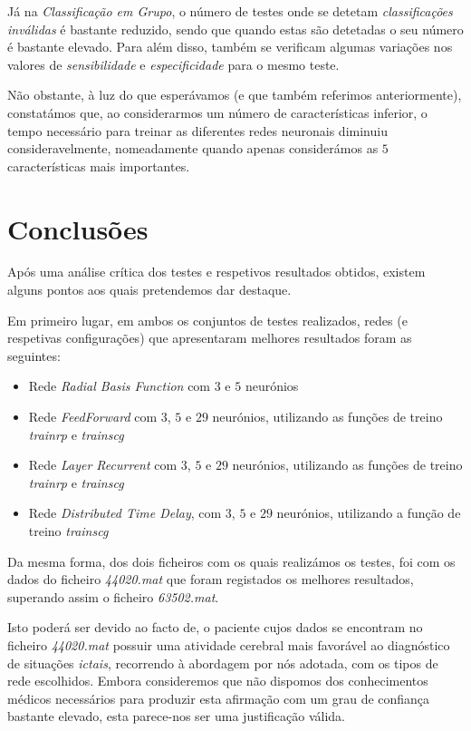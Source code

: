 \documentclass{article}
\begin{document}
Já na \emph{Classificação em Grupo}, o número de testes onde se detetam \emph{classificações inválidas} é bastante reduzido, sendo que quando estas são detetadas o seu número é bastante elevado. Para além disso, também se verificam algumas variações nos valores de \emph{sensibilidade} e \emph{especificidade} para o mesmo teste.

Não obstante, à luz do que esperávamos (e que também referimos anteriormente), constatámos que, ao considerarmos um número de características inferior, o tempo necessário para treinar as diferentes redes neuronais diminuiu consideravelmente, nomeadamente quando apenas considerámos as $5$ características mais importantes.

\pagebreak

\section{Conclusões}

Após uma análise crítica dos testes e respetivos resultados obtidos, existem alguns pontos aos quais pretendemos dar destaque.

Em primeiro lugar, em ambos os conjuntos de testes realizados, redes (e respetivas configurações) que apresentaram melhores resultados foram as seguintes:

\begin{itemize}
\item Rede \emph{Radial Basis Function} com $3$ e $5$ neurónios

\item Rede \emph{FeedForward} com $3$, $5$ e $29$ neurónios, utilizando as funções de treino \emph{trainrp} e \emph{trainscg}

\item Rede \emph{Layer Recurrent} com $3$, $5$ e $29$ neurónios, utilizando as funções de treino \emph{trainrp} e \emph{trainscg}

\item Rede \emph{Distributed Time Delay}, com $3$, $5$ e $29$ neurónios, utilizando a função de treino \emph{trainscg}
\end{itemize}

Da mesma forma, dos dois ficheiros com os quais realizámos os testes, foi com os dados do ficheiro \emph{44020.mat} que foram registados os melhores resultados, superando assim o ficheiro \emph{63502.mat}.

Isto poderá ser devido ao facto de, o paciente cujos dados se encontram no ficheiro \emph{44020.mat} possuir uma atividade cerebral mais favorável ao diagnóstico de situações \emph{ictais}, recorrendo à abordagem por nós adotada, com os tipos de rede escolhidos. Embora consideremos que não dispomos dos conhecimentos médicos necessários para produzir esta afirmação com um grau de confiança bastante elevado, esta parece-nos ser uma justificação válida.
\end{document}
